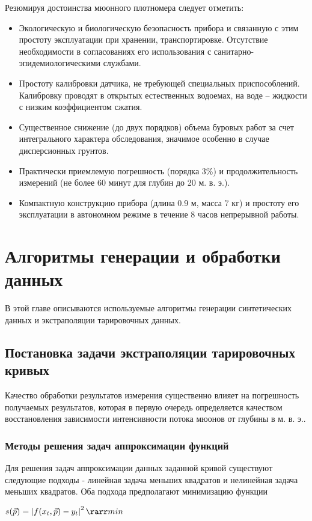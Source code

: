\documentclass[a4paper,10pt]{article}
\begin{document}
Резюмируя достоинства мюонного плотномера следует отметить:
\begin{itemize}
  \item Экологическую и биологическую безопасность прибора и 
  связанную с этим простоту эксплуатации при хранении, 
  транспортировке. Отсутствие необходимости в 
  согласованиях его использования с санитарно-эпидемиологическими 
  службами.
  \item Простоту калибровки датчика, не требующей специальных 
  приспособлений. Калибровку проводят в открытых естественных 
  водоемах, на воде – жидкости с низким коэффициентом сжатия. 
  \item Существенное снижение (до двух порядков) объема 
  буровых работ  за счет интегрального характера обследования, 
  значимое особенно в случае дисперсионных грунтов.
  \item Практически приемлемую погрешность (порядка 3\%) и 
  продолжительность измерений (не более 60 минут для глубин до 
  20 м. в. э.).
  \item Компактную конструкцию прибора (длина 0.9 м, масса 7 кг) 
  и простоту его эксплуатации в автономном режиме в течение 8 
  часов непрерывной работы.
\end{itemize}





\section{Алгоритмы генерации и обработки данных}

В этой главе описываются используемые алгоритмы генерации синтетических данных и экстраполяции тарировочных данных. 


\subsection{Постановка задачи экстраполяции тарировочных кривых}

Качество обработки результатов измерения существенно влияет на погрешность получаемых результатов, которая в первую очередь определяется
качеством восстановления зависимости интенсивности потока мюонов от глубины в м. в. э..


\subsubsection{Методы решения задач аппроксимации функций}
Для решения задач аппроксимации данных заданной кривой существуют следующие подходы - линейная задача меньших квадратов и 
нелинейная задача меньших квадратов. Оба подхода предполагают минимизацию функции 
\begin{center}
 $ s(\vec{p}) = \left| f(x_t, \vec{p}) - y_t \right| ^ 2 \rarr min $
\end{center}
\end{document}
